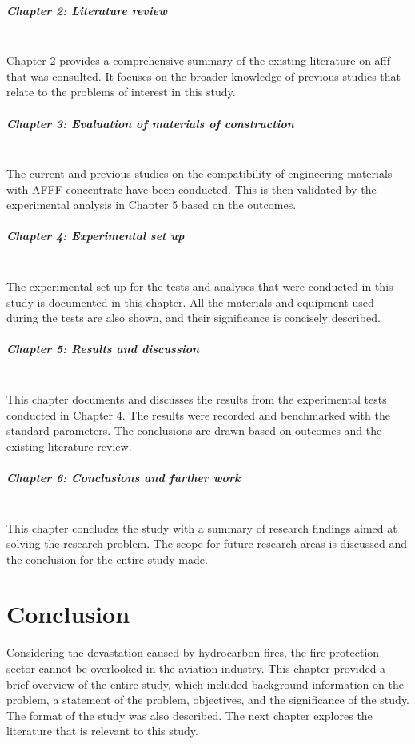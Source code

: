 \subparagraph*{Chapter 2: Literature review}\hfill\\
Chapter 2 provides a comprehensive summary of the existing literature on \acrshort{afff} that was consulted. It focuses on the broader knowledge of previous studies that relate to the problems of interest in this study.

\subparagraph*{Chapter 3: Evaluation of materials of construction}\hfill\\
The current and previous studies on the compatibility of engineering materials with AFFF concentrate have been conducted. This is then validated by the experimental analysis in Chapter 5 based on the outcomes.

\subparagraph*{Chapter 4: Experimental set up}\hfill\\
The experimental set-up for the tests and analyses that were conducted in this study is documented in this chapter. All the materials and equipment used during the tests are also shown, and their significance is concisely described.

\subparagraph*{Chapter 5: Results and discussion}\hfill\\
This chapter documents and discusses the results from the experimental tests conducted in Chapter 4. The results were recorded and benchmarked with the standard parameters. The conclusions are drawn based on outcomes and the existing literature review. 

\subparagraph*{Chapter 6: Conclusions and further work}\hfill\\
This chapter concludes the study with a summary of research findings aimed at solving the research problem. The scope for future research areas is discussed and the conclusion for the entire study made.

\section{Conclusion}
Considering the devastation caused by hydrocarbon fires, the fire protection sector cannot be overlooked in the aviation industry. This chapter provided a brief overview of the entire study, which included background information on the problem, a statement of the problem, objectives, and the significance of the study. The format of the study was also described. The next chapter explores the literature that is relevant to this study.